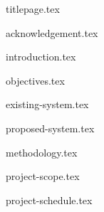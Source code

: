 \documentclass[a4paper,12pt,titlepage,oneside]{article}
\begin{document}
{titlepage.tex}

\newpage
{acknowledgement.tex}

\newpage
\tableofcontents
{}

\newpage
{introduction.tex}

{objectives.tex}

{existing-system.tex}

{proposed-system.tex}

{methodology.tex}

{project-scope.tex}

{project-schedule.tex}
\end{document}
